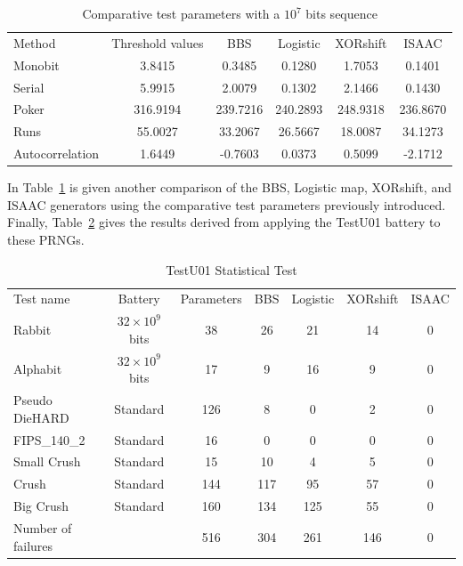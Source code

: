 \begin{table}[!t]
\renewcommand{\arraystretch}{1.3}
\caption{Comparative test parameters with a $10^7$ bits sequence}
\label{Comparison3}
\centering
\begin{tabular}{lccccc}
 \toprule
Method			&Threshold values 	 &BBS		&Logistic	& XORshift	& ISAAC\\
Monobit			&3.8415			&0.3485&0.1280		&1.7053		&0.1401\\ \hline
Serial		&5.9915 		&2.0079	 &0.1302		&2.1466		&0.1430\\ \hline
Poker			&316.9194 		&239.7216 	&240.2893	&248.9318	&236.8670\\ \hline
Runs 			&55.0027		&33.2067	&26.5667	&18.0087	&34.1273 \\ \hline
Autocorrelation		&1.6449			&-0.7603	& 0.0373	&0.5099 	&-2.1712\\ 
\bottomrule
\end{tabular}
\end{table}

In Table~\ref{Comparison3} is given another comparison of the BBS,
Logistic map, XORshift, and ISAAC generators using the comparative test 
parameters previously introduced.
Finally, Table~\ref{TestU011} gives the results derived from applying the 
TestU01 battery to these PRNGs.
\begin{table}[!t]
\renewcommand{\arraystretch}{1.3}
\caption{TestU01 Statistical Test}
\label{TestU011}
\centering
\begin{tabular}{lcccccc}
\toprule
Test name &Battery&Parameters &BBS& Logistic 		& XORshift	& ISAAC\\
Rabbit 				&$32\times10^9$ bits	&38 &26	&21	 	&14	&0	 \\
Alphabit 			&$32\times10^9$ bits	&17 &9	&16 		&9	&0	 \\
Pseudo DieHARD 			&Standard		&126 &8	&0 	 	&2	&0	\\
FIPS\_140\_2 			&Standard		&16&0	&0 		&0	&0	\\
Small Crush 			&Standard		&15 &10	&4 		&5	&0	 \\
Crush 				&Standard		&144 &117	&95 		&57	&0	 \\
Big Crush 			&Standard		&160 &134	&125 	 	&55	&0	 \\ \hline
Number of failures 		& 			&516 &304	&261 	 	&146	&0	 \\
\bottomrule
\end{tabular}
\end{table}



